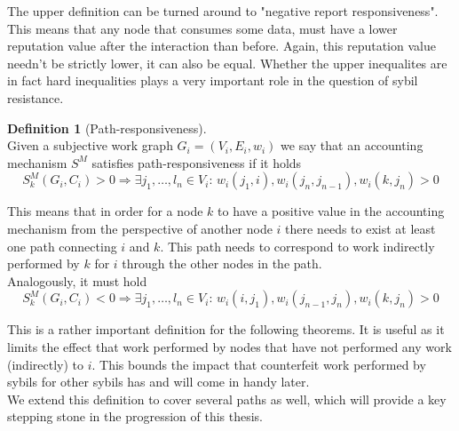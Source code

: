 \documentclass[11pt,a4paper]{report}
\theoremstyle{definition}
\newtheorem{definition}{Definition}[section]
\theoremstyle{theorem}
\theoremstyle{proposition}
\theoremstyle{corollary}
\theoremstyle{lemma}
\theoremstyle{example}
\theoremstyle{remark}
\begin{document}
\noindent{}The upper definition can be turned around to "negative report responsiveness". This means that any node that consumes some data, must have a lower reputation value after the interaction than before. Again, this reputation value needn't be strictly lower, it can also be equal. Whether the upper inequalites are in fact hard inequalities plays a very important role in the question of sybil resistance.\vspace{1em}\\ 

\begin{definition}[Path-responsiveness]\ \\
Given a subjective work graph $G_i=(V_i,E_i,w_i)$ we say that an accounting mechanism $S^M$ satisfies path-responsiveness if it holds
\[
S^M_k(G_i,C_i)>0\Rightarrow\exists{}j_1,\ldots,l_n\in{}V_i:\,w_i(j_1,i),w_i(j_n,j_{n-1}),w_i(k,j_n)>0
\]
\end{definition}
\noindent{}This means that in order for a node $k$ to have a positive value in the accounting mechanism from the perspective of another node $i$ there needs to exist at least one path connecting $i$ and $k$. This path needs to correspond to work indirectly performed by $k$ for $i$ through the other nodes in the path. \vspace{1em}\\

\noindent{}Analogously, it must hold
\[
S^M_k(G_i,C_i)<0\Rightarrow\exists{}j_1,\ldots,l_n\in{}V_i:\,w_i(i,j_1),w_i(j_{n-1},j_n),w_i(k,j_n)>0
\]

\noindent{}This is a rather important definition for the following theorems. It is useful as it limits the effect that work performed by nodes that have not performed any work (indirectly) to $i$. This bounds the impact that counterfeit work performed by sybils for other sybils has and will come in handy later. \vspace{1em}\\

\noindent{}We extend this definition to cover several paths as well, which will provide a key stepping stone in the progression of this thesis. 
\end{document}
